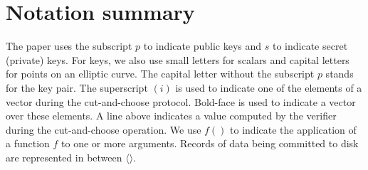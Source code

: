 \documentclass{llncs}
\begin{document}
\newpage
\appendix

\section{Notation summary}

The paper uses the subscript $p$ to indicate public keys and $s$ to
indicate secret (private) keys.  For keys, we also use small letters
for scalars and capital letters for points on an elliptic curve.  The
capital letter without the subscript $p$ stands for the key pair.  The
superscript $(i)$ is used to indicate one of the elements of a vector
during the cut-and-choose protocol.  Bold-face is used to indicate a
vector over these elements.  A line above indicates a value computed
by the verifier during the cut-and-choose operation.  We use $f()$ to
indicate the application of a function $f$ to one or more arguments. Records of
data being committed to disk are represented in between $\langle\rangle$.
\end{document}
